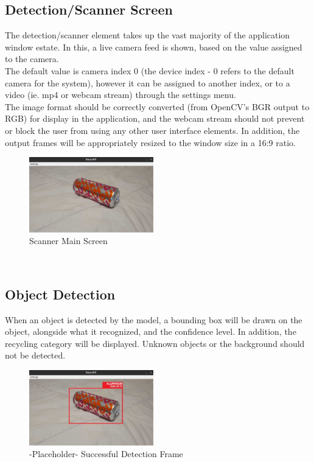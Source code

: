 \documentclass[conference]{IEEEtran}
\begin{document}
\newpage
\subsection{Detection/Scanner Screen}
The detection/scanner element takes up the vast majority of the application window estate. In this, a live camera feed is shown, based on the value assigned to the camera. ~\\

The default value is camera index 0 (the device index - 0 refers to the default camera for the system), however it can be assigned to another index, or to a video (ie. mp4 or webcam stream) through the settings menu.~\\

The image format should be correctly converted (from OpenCV's BGR output to RGB) for display in the application, and the webcam stream should not prevent or block the user from using any other user interface elements. In addition, the output frames will be appropriately resized to the window size in a 16:9 ratio.

\begin{figure}[h]
    \centering
    \includegraphics[width=0.48\textwidth]{images/scanner.eps}
    \caption{Scanner Main Screen}
\end{figure}~\\

\subsection{Object Detection}
When an object is detected by the model, a bounding box will be drawn on the object, alongside what it recognized, and the confidence level. In addition, the recycling category will be displayed. Unknown objects or the background should not be detected.~\\

\begin{figure}[h]
    \centering
    \includegraphics[width=0.48\textwidth]{images/object_detected.eps}
    \caption{-Placeholder- Successful Detection Frame}
\end{figure}~\\
\end{document}
